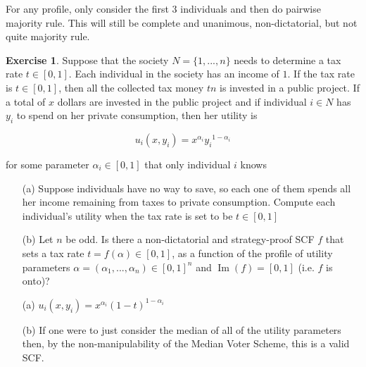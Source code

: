 \documentclass[11pt,oneside]{article}
\numberwithin{equation}{section}
\theoremstyle{definition}
\newtheorem{exercise}{Exercise}
\renewcommand{\Im}{\operatorname{Im}}
\begin{document}
\begin{solution}

For any profile, only consider the first $3$ individuals and then do pairwise majority rule. This will still be complete and unanimous, non-dictatorial, but not quite majority rule. 

\end{solution}

\begin{exercise}
Suppose that the society $N = \{1, . . . , n\}$ needs to determine a tax rate $t \in [0, 1]$. Each individual in the society has an income of $1$. If the tax rate is $t \in [0, 1]$, then all the collected tax money $tn$ is invested in a public project. If a total of $x$ dollars are invested in the public project and if individual $i \in N$ has $y_i$ to spend on her private consumption, then her utility is

\[u_i(x,y_i) = x^{\alpha_i} {y_i}^{1-\alpha_i} \] 

for some parameter $\alpha_i \in [0,1]$ that only individual $i$ knows
\begin{enumerate}

\item[(a)] Suppose individuals have no way to save, so each one of them spends all her income remaining from taxes to private consumption. Compute each individual’s utility when the tax rate is set to be $t \in [0, 1]$

\item[(b)] Let $n$ be odd. Is there a non-dictatorial and strategy-proof SCF $f$ that sets a tax rate $t = f (\alpha) \in [0, 1]$, as a function of the profile of utility parameters $\alpha = (\alpha_1, . . . , \alpha_n) \in {[0, 1]}^n$ and $\Im(f ) = [0, 1]$ (i.e. $f$ is onto)?


\end{enumerate}
\end{exercise}

\begin{solution}

\begin{enumerate}

\item[(a)] $u_i(x,y_i) = x^{\alpha_i} {(1-t)}^{1-\alpha_i}$
\item[(b)] If one were to just consider the median of all of the utility parameters then, by the non-manipulability of the 
Median Voter Scheme, this is a valid SCF.   \end{enumerate}



\end{solution}
\end{document}
